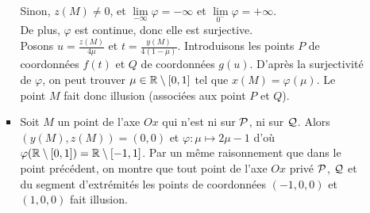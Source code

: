 \begin{enumerate}
\begin{enumerate}
\begin{itemize}
Sinon,  $z(M)\neq 0$, et  $\lim\limits_{-\infty}\varphi=-\infty$ et $\lim\limits_{0^-}\varphi=+\infty$.\\
De plus, $\varphi$ est continue, donc elle   est surjective.\\
Posons $u=\frac{z(M)}{4\mu}$ et  $t=\frac{y(M)}{4(1-\mu)}$. Introduisons les points $P$ de coordonnées $f(t)$ et $Q$ de coordonnées $g(u)$. D'après la surjectivité de $\varphi$, on peut trouver $\mu\in\mathbb{R}\setminus[0,1]$ tel que $x(M)=\varphi(\mu)$. Le point $M$ fait donc illusion (associées aux point $P$ et $Q$).
\item Soit $M$ un point de l'axe $Ox$ qui n'est ni sur $\cal P$, ni sur $\cal Q$. Alors $(y(M),z(M))=(0,0)$ et $\varphi:\mu\mapsto 2\mu-1$ d'où $\varphi(\mathbb{R}\setminus[0,1])=\mathbb{R}\setminus[-1,1]$. Par un même raisonnement  que dans le point précédent, on montre que tout point de l'axe $Ox$ privé $\cal P$, $\cal Q$ et du segment d'extrémités les points de coordonnées $(-1,0,0)$ et $(1,0,0)$ fait illusion. 
\end{itemize}
\end{enumerate}
\end{enumerate}
